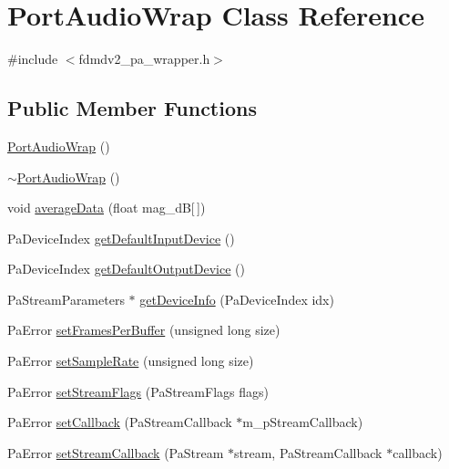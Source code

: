 \hypertarget{class_port_audio_wrap}{\section{Port\-Audio\-Wrap Class Reference}
\label{class_port_audio_wrap}
}


{\ttfamily \#include $<$fdmdv2\-\_\-pa\-\_\-wrapper.\-h$>$}

\subsection*{Public Member Functions}
\begin{DoxyCompactItemize}
\item 
\hyperlink{class_port_audio_wrap_a598776f72e5959e0e5baba02a1e6e5dc}{Port\-Audio\-Wrap} ()
\item 
\hyperlink{class_port_audio_wrap_ad65d5940f33e2fa15069aa15816d1582}{$\sim$\-Port\-Audio\-Wrap} ()
\item 
void \hyperlink{class_port_audio_wrap_a987405b6ca5fbecb33ac69ddfe843659}{average\-Data} (float mag\-\_\-d\-B\mbox{[}$\,$\mbox{]})
\item 
Pa\-Device\-Index \hyperlink{class_port_audio_wrap_a2a122bf5de62e7f1fb1bfed6801e063c}{get\-Default\-Input\-Device} ()
\item 
Pa\-Device\-Index \hyperlink{class_port_audio_wrap_a8cde3f5f6f312fbd8c0ad60619d617ad}{get\-Default\-Output\-Device} ()
\item 
Pa\-Stream\-Parameters $\ast$ \hyperlink{class_port_audio_wrap_a246ec79a44d879a74d6afe3e1005bc00}{get\-Device\-Info} (Pa\-Device\-Index idx)
\item 
Pa\-Error \hyperlink{class_port_audio_wrap_a34ec7a96cbe5859f4a6aba6cb4b508cf}{set\-Frames\-Per\-Buffer} (unsigned long size)
\item 
Pa\-Error \hyperlink{class_port_audio_wrap_a7245832a8cafbc8d140a51e106838fbb}{set\-Sample\-Rate} (unsigned long size)
\item 
Pa\-Error \hyperlink{class_port_audio_wrap_a47fe0dd437c0a4693824966e7100255a}{set\-Stream\-Flags} (Pa\-Stream\-Flags flags)
\item 
Pa\-Error \hyperlink{class_port_audio_wrap_a2a40702f7b56abb4b6927fb6493db92e}{set\-Callback} (Pa\-Stream\-Callback $\ast$m\-\_\-p\-Stream\-Callback)
\item 
Pa\-Error \hyperlink{class_port_audio_wrap_adf02f262bcd9f85c33fea7da0e4cd841}{set\-Stream\-Callback} (Pa\-Stream $\ast$stream, Pa\-Stream\-Callback $\ast$callback)

\end{DoxyCompactItemize}
